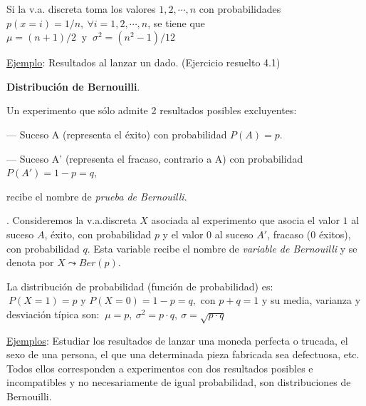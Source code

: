 \vspace{2mm}\textcolor{gris}{Si la v.a. discreta toma los valores $1,2,\cdots, n$ con probabilidades $p(x=i)=1/n,\ \forall i=1,2,\cdots , n$, se tiene que $\mu=(n+1)/2 \ \text{ y } \ \sigma^2=(n^2-1)/12$}


\vspace{2mm}  \underline{Ejemplo}: Resultados al lanzar un dado. (Ejercicio resuelto 4.1)


\vspace{15mm}  %

\textbf{\large{Distribución de Bernouilli}}.

\normalsize{Un} experimento que sólo admite 2 resultados posibles excluyentes:

\hspace{1cm} --- Suceso A (representa el  éxito) con probabilidad $P (A) = p$.

\hspace{1cm} --- Suceso A' (representa el fracaso, contrario a A) con probabilidad $P(A') =1-p=q$,

recibe el nombre de \emph{prueba de Bernouilli}.

\begin{definition}
	.  \vspace{2mm}  Consideremos la v.a.discreta $X$ asociada al experimento que asocia el valor $1$ al suceso $A$, éxito,  con probabilidad $p$ y el valor $0$ al suceso $A'$, fracaso (0 éxitos), con probabilidad $q$. Esta variable recibe el nombre de \emph{variable de Bernouilli} y se denota por $X \leadsto Ber(p)$.

\vspace{2mm}  La distribución de probabilidad (función de probabilidad) es:
$\ P (X = 1) = p \text{ y } P (X = 0) = 1-p=q,  \text{ con } p+q= 1$
y su media, varianza y desviación típica son:
$\ \mu =p ,\  \sigma^2 =p\cdot q ,\  \sigma =\sqrt{p\cdot q}$
\end{definition}



\vspace{2mm} \underline{Ejemplos}: Estudiar los resultados de lanzar una moneda perfecta o trucada, el sexo de una persona, el que una determinada pieza fabricada sea defectuosa, etc. Todos ellos corresponden a experimentos con dos resultados posibles e incompatibles y no necesariamente de igual probabilidad, son distribuciones de Bernouilli.



